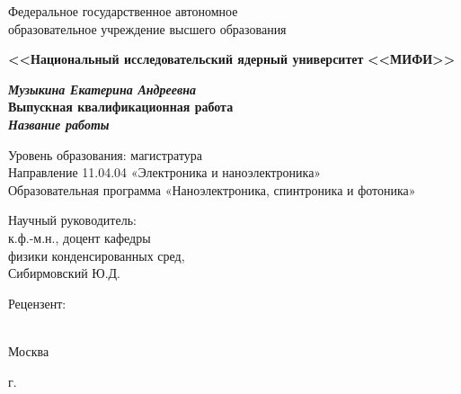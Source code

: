 \begin{titlepage}
\begin{center}

Федеральное государственное автономное \\образовательное учреждение высшего образования

\textbf{<<Национальный исследовательский ядерный университет}
\textbf{<<МИФИ>>}

\vspace{35mm}

\textbf{\textit{\large Музыкина Екатерина Андреевна}} \\[8mm]
\textbf{\large Выпускная квалификационная работа}\\[3mm]
\textbf{\textit{\large Название работы}}

\vspace{20mm}
Уровень образования: магистратура\\
Направление 11.04.04 «Электроника и наноэлектроника»\\
Образовательная программа
«Наноэлектроника, спинтроника и фотоника»\\[25mm]


\begin{flushright}
\begin{minipage}[t]{0.5\textwidth}
{Научный руководитель:} \\
к.ф.-м.н., доцент кафедры \\физики конденсированных сред, \\ Сибирмовский Ю.Д.

\vspace{10mm}

{Рецензент:} \\
 \\
\end{minipage}
\end{flushright}

\vfill 

{Москва}
\par{\the\year{} г.}
\end{center}
\end{titlepage}
\restoregeometry
\addtocounter{page}{1}
